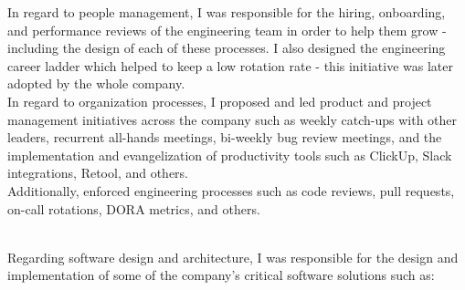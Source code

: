 \documentclass[9pt]{developercv} %
\begin{document}
\begin{entrylist}
{            In regard to people management, I was responsible for the hiring, onboarding, and
            performance reviews of the engineering team in order to help them grow - including 
            the design of each of these processes. I also designed the engineering career ladder 
            which helped to keep a low rotation rate - this initiative was later adopted by the 
            whole company.\\

            In regard to organization processes, I proposed and led product and project 
            management initiatives across the company such as weekly catch-ups with other leaders, 
            recurrent all-hands meetings, bi-weekly bug review meetings, and the implementation and 
            evangelization of productivity tools such as ClickUp, Slack integrations, Retool, 
            and others. \\

            Additionally, enforced engineering processes such as code reviews, pull requests, 
            on-call rotations, DORA metrics, and others.
        }

    \entry
        {}
        {}
        {}
        {\\
            Regarding software design and architecture, I was responsible for the design and
            implementation of some of the company's critical software solutions such as:

}
\end{entrylist}
\end{document}
